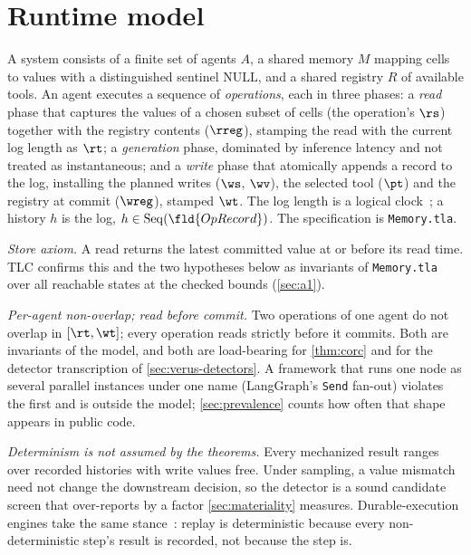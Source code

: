 \section{Runtime model}
\label{sec:model}

A system consists of a finite set of agents $A$, a shared memory $M$ mapping
cells to values with a distinguished sentinel $\mathrm{NULL}$, and a shared
registry $R$ of available tools. An agent executes a sequence of
\emph{operations}, each in three phases: a \emph{read} phase that captures the
values of a chosen subset of cells (the operation's $\rs$) together with the
registry contents ($\rreg$), stamping the read with the current log length as
$\rt$; a \emph{generation} phase, dominated by inference latency and not
treated as instantaneous; and a \emph{write} phase that atomically appends a
record to the log, installing the planned writes ($\ws$, $\wv$), the selected
tool ($\pt$) and the registry at commit ($\wreg$), stamped $\wt$. The log
length is a logical clock~\cite{Lamport1978TimeClocks}; a history $h$ is the
log, $h\in\mathrm{Seq}(\fld{OpRecord})$. The specification is
\texttt{Memory.tla}.

\smallskip\noindent\emph{Store axiom.} A read returns the latest committed
value at or before its read time. TLC confirms this and the two hypotheses
below as invariants of \texttt{Memory.tla} over all
\CommitOrderMemoryStates{} reachable states at the checked bounds
(\cref{sec:a1}).

\smallskip\noindent\emph{Per-agent non-overlap; read before commit.} Two
operations of one agent do not overlap in $[\rt,\wt]$; every operation reads
strictly before it commits. Both are invariants of the model, and both are
load-bearing for \cref{thm:corc} and for the detector transcription of
\cref{sec:verus-detectors}. A framework that runs one node as several parallel
instances under one name (LangGraph's \texttt{Send} fan-out) violates the first
and is outside the model; \cref{sec:prevalence} counts how often that shape
appears in public code.

\smallskip\noindent\emph{Determinism is not assumed by the theorems.} Every
mechanized result ranges over recorded histories with write values free. Under
sampling, a value mismatch need not change the downstream decision, so the
 detector is a sound candidate screen that over-reports by a factor
\cref{sec:materiality} measures. Durable-execution engines take the same
stance~\cite{BurckhardtEtAl2021Durable}: replay is deterministic because every
non-deterministic step's result is recorded, not because the step is.

